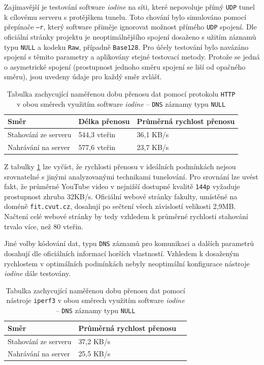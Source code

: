 \documentclass[thesis=M,czech]{FITthesis}[2012/10/20]
\begin{document}
Zajímavější je testování software \textit{iodine} na síti, které nepovoluje přímý \texttt{UDP} tunel k cílovému serveru s protějškem tunelu. Toto chování bylo simulováno pomocí přepínače \texttt{--r}, který software přiměje ignorovat možnost přímého \texttt{UDP} spojení. Dle oficiální stránky projektu je neoptimálnějšího spojení dosaženo s užitím záznamů typu \texttt{NULL} a kodeku \texttt{Raw}, případně \texttt{Base128}. Pro účely testování bylo navázáno spojení s těmito parametry a aplikovány stejné testovací metody. Protože se jedná o asymetrické spojení (prostupnost jednoho směru spojení se liší od opačného směru), jsou uvedeny údaje pro každý směr zvlášť.


    \begin{table}[h]
	\centering
	\begin{tabular}{|l||l|l|}
	\hline
	Směr  & Délka přenosu & Průměrná rychlost přenosu \\ \hline \hline
	Stahování ze serveru  & 544,3 vteřin   & 36,1 KB/s                 \\ \hline
	Nahrávání na server   & 577,6 vteřin   & 23,7 KB/s                 \\ \hline
	\end{tabular}
	\caption{Tabulka zachycující naměřenou dobu přenosu dat pomocí protokolu \texttt{HTTP} v obou směrech využitím software \textit{iodine} -- \texttt{DNS} záznamy typu \texttt{NULL}}
	\label{tab:iodine-down-up}
    \end{table}
    
    
    Z tabulky \ref{tab:iodine-down-up} lze vyčíst, že rychlosti přenosu v ideálních podmínkách nejsou srovnatelné s jinými analyzovanými technikami tunelování. Pro srovnání lze uvést fakt, že průměrné YouTube video v nejnižší dostupné kvalitě \texttt{144p} vyžaduje prostupnost zhruba 32KB/s\cite{youtube-data-usage}. Oficiální webové stránky fakulty, umístěné na doméně \texttt{fit.cvut.cz}, dosahují po sečtení všech závislostí velikosti 2,9MB. Načtení celé webové stránky by tedy vzhledem k průměrné rychlosti stahování trvalo více, než 80 vteřin.
    
    Jiné volby kódování dat, typu \texttt{DNS} záznamů pro komunikaci a dalších parametrů dosahují dle oficiálních informací\cite{iodine-repo} horších vlastností. Vzhledem k dosaženým rychlostem v optimálních podmínkách nebyly neoptimální konfigurace nástroje \textit{iodine} dále testovány.
    
    
    \begin{table}[h]
	\centering
	\begin{tabular}{|l||l|l|}
	\hline
	Směr  & Průměrná rychlost přenosu \\ \hline \hline
	Stahování ze serveru  & 37,2 KB/s                 \\ \hline
	Nahrávání na server   & 25,5 KB/s                 \\ \hline
	\end{tabular}
	\caption{Tabulka zachycující naměřenou dobu přenosu dat pomocí nástroje \texttt{iperf3} v obou směrech využitím software \textit{iodine} -- \texttt{DNS} záznamy typu \texttt{NULL}}
	\label{tab:iperf-download}
    \end{table}
    
\end{document}
